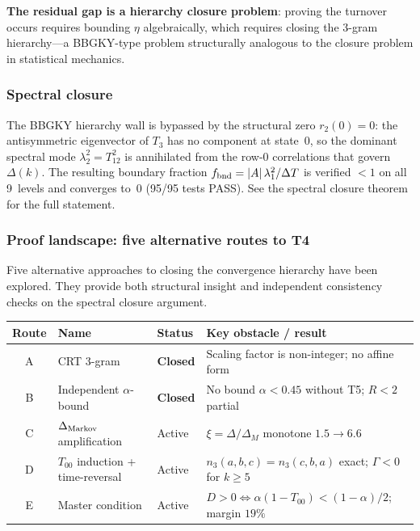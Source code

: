 \documentclass[12pt,a4paper]{article}
\begin{document}
\textbf{The residual gap is a hierarchy closure problem}: proving
the turnover occurs requires bounding $\eta$ algebraically, which
requires closing the 3-gram hierarchy---a BBGKY-type problem
structurally analogous to the closure problem in statistical
mechanics.

\subsubsection{Spectral closure}

The BBGKY hierarchy wall is bypassed by the
structural zero $r_2(0) = 0$: the antisymmetric eigenvector of
$T_3$ has no component at state~$0$, so the dominant spectral mode
$\lambda_2^2 = T_{12}^2$ is annihilated from the row-$0$ correlations
that govern $\Delta(k)$. The resulting boundary fraction
$f_{\rm bnd} = |A|\,\lambda_1^2/\Delta T$ is verified $< 1$ on all
9~levels and converges to~$0$ (95/95 tests PASS).
See the spectral closure theorem~\cite{companion_M3} for the full statement.

\subsubsection{Proof landscape: five alternative routes to T4}
\label{sec:ch7b_five_routes}

Five alternative approaches to closing the convergence hierarchy
have been explored. They provide both
structural insight and independent consistency checks on the
spectral closure argument.

\begin{center}
\begin{tabular}{clll}
\toprule
\textbf{Route} & \textbf{Name} & \textbf{Status} & \textbf{Key obstacle / result} \\
\midrule
A & CRT 3-gram & \textbf{Closed} & Scaling factor is non-integer; no affine form \\
B & Independent $\alpha$-bound & \textbf{Closed} & No bound $\alpha < 0.45$ without T5; $R < 2$ partial \\
C & $\Delta_{\rm Markov}$ amplification & Active & $\xi = \Delta/\Delta_M$ monotone $1.5 \to 6.6$ \\
D & $T_{00}$ induction + time-reversal & Active & $n_3(a,b,c) = n_3(c,b,a)$ exact; $\Gamma < 0$ for $k \geq 5$ \\
E & Master condition & Active & $D > 0 \Leftrightarrow \alpha(1-T_{00}) < (1-\alpha)/2$; margin $19\%$ \\
\bottomrule
\end{tabular}
\end{center}
\end{document}
